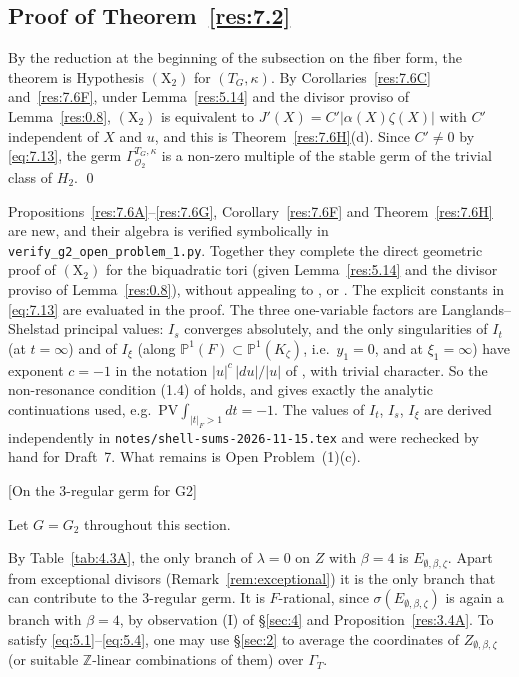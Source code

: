 \documentclass[12pt,letterpaper]{amsart}
\theoremstyle{plain}
\theoremstyle{definition}
\theoremstyle{remark}
\theoremstyle{definition}
\newcommand{\zzz}{\mathbb{Z}}
\begin{document}
\subsection*{Proof of \texorpdfstring{Theorem~\ref{res:7.2}}{Theorem 7.2}}

By the reduction at the beginning of the subsection on the fiber form, the
theorem is Hypothesis $(\mathrm X_2)$ for $(T_G,\kappa)$. By
Corollaries~\ref{res:7.6C} and~\ref{res:7.6F}, under Lemma~\ref{res:5.14} and
the divisor proviso of Lemma~\ref{res:0.8}, $(\mathrm X_2)$ is equivalent to
$J'(X)=C'|\alpha(X)\zeta(X)|$ with $C'$ independent of $X$ and $u$, and this is
Theorem~\ref{res:7.6H}(d). Since $C'\neq0$ by \eqref{eq:7.13}, the germ
$\Gamma^{T_G,\kappa}_{\mathcal O_2}$ is a non-zero multiple of the stable germ
of the trivial class of $H_2$. \qed

\begin{rem26}\label{rem:7.status}
Propositions~\ref{res:7.6A}--\ref{res:7.6G}, Corollary~\ref{res:7.6F} and
Theorem~\ref{res:7.6H} are new, and their algebra is verified symbolically in
\texttt{verify\_g2\_open\_problem\_1.py}. Together they complete the direct
geometric proof of $(\mathrm X_2)$ for the biquadratic tori (given
Lemma~\ref{res:5.14} and the divisor proviso of Lemma~\ref{res:0.8}), without
appealing to \cite{Wa97}, \cite{Ng10} or \cite{GH16}. The explicit constants
in \eqref{eq:7.13} are evaluated in the proof. The three one-variable factors
are Langlands--Shelstad principal values: $I_s$ converges absolutely, and the
only singularities of $I_t$ (at $t=\infty$) and of $I_\xi$ (along
$\mathbb P^1(F)\subset\mathbb P^1(K_\zeta)$, i.e.\ $y_1=0$, and at $\xi_1=\infty$)
have exponent $c=-1$ in the notation $|u|^c\,|du|/|u|$ of
\cite[\S1]{LS83}, with trivial character. So the non-resonance condition (1.4)
of \cite{LS83} holds, and \cite[Lemma~1.A]{LS83} gives exactly the
analytic continuations used, e.g.\ $\mathrm{PV}\!\int_{|t|_F>1}dt=-1$. The
values of $I_t$, $I_s$, $I_\xi$ are derived independently in
\texttt{notes/shell-sums-2026-11-15.tex} and were rechecked by hand for
Draft~7. What remains is Open Problem~(1)(c).
\end{rem26}


[On the 3-regular germ for G2]\label{sec:8}

Let $G=G_2$ throughout this section.

By Table~\ref{tab:4.3A}, the only branch of $\lambda=0$ on $Z$ with
$\beta=4$ is $E_{\emptyset,\beta,\zeta}$. Apart from exceptional divisors
(Remark~\ref{rem:exceptional}) it is the only branch that can contribute to
the $3$-regular germ. It is $F$-rational, since
$\sigma(E_{\emptyset,\beta,\zeta})$ is again a branch with $\beta=4$, by
observation (I) of \S\ref{sec:4} and Proposition~\ref{res:3.4A}.
To satisfy \eqref{eq:5.1}--\eqref{eq:5.4}, one may use
\S\ref{sec:2} to average the coordinates of
$Z_{\emptyset,\beta,\zeta}$
(or suitable $\zzz$-linear combinations of them)
over $\Gamma_T$.
\end{document}
